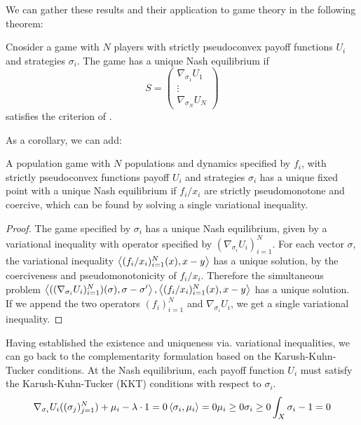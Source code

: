 We can gather these results and their application to game theory in the following theorem:
\begin{theorem}
  Cnosider a game with $N$ players with strictly pseudoconvex payoff functions $U_i$ and strategies $\sigma_i$. The game has a unique Nash equilibrium if
  \begin{equation}
    S=
    \begin{pmatrix}
      \nabla_{\sigma_1} U_1\\
      \vdots \\
      \nabla_{\sigma_N} U_N
    \end{pmatrix}
  \end{equation}
  satisfies the criterion of .
\end{theorem}
As a corollary, we can add:
\begin{corollary}
  A population game with $N$ populations and dynamics specified by $f_i$, with strictly pseudoconvex functions payoff $U_i$ and strategies $\sigma_i$ has a unique fixed point with a unique Nash equilibrium if $f_i/x_i$ are strictly pseudomonotone and coercive, which can be found by solving a single variational inequality.
\end{corollary}
\begin{proof}
  The game specified by $\sigma_i$ has a unique Nash equilibrium, given by a variational inequality with operator specified by $(\nabla_{\sigma_i} U_i)_{i=1}^N$. For each vector $\sigma$, the variational inequality $\left \langle (f_i/x_i)_{i=1}^N(x),x-y \right \rangle$ has a unique solution, by the coerciveness and pseudomonotonicity of $f_i/x_i$. Therefore the simultaneous problem $\left \langle ((\nabla_{\sigma_i} U_i)_{i=1}^N)(\sigma),\sigma-\sigma' \right \rangle, \left \langle (f_i/x_i)_{i=1}^N(x),x-y \right \rangle$ has a unique solution. If we append the two operators $(f_i)_{i=1}^N$ and $\nabla_{\sigma_i} U_i$, we get a single variational inequality.
\end{proof}
Having established the existence and uniqueness via. variational inequalities, we can go back to the complementarity formulation based on the Karush-Kuhn-Tucker conditions.
At the Nash equilibrium, each payoff function $U_i$ must satisfy the Karush-Kuhn-Tucker (KKT) conditions with respect to $\sigma_i$.
\begin{align}
  \nabla_{\sigma_i}U_i((\sigma_j)_{j=1}^N) + \mu_i - \lambda \cdot 1 = 0
  \left \langle \sigma_i,\mu_i \right \rangle = 0
  \mu_i \geq 0
  \sigma_i \geq 0
  \int_X \sigma_i - 1 = 0
\end{align}
